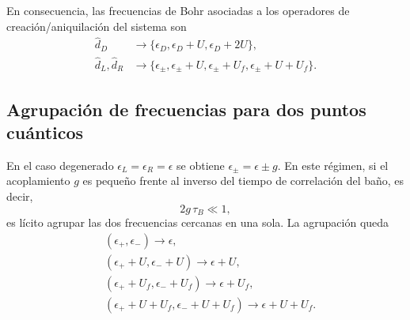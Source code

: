 \begin{appendixs}
En consecuencia, las frecuencias de Bohr asociadas a los operadores de creación/aniquilación del sistema son
\begin{align*}
    \hat{d}_{D} & \rightarrow \{\epsilon_{D}, \epsilon_{D}+U, \epsilon_{D}+2U\}, \\
    \hat{d}_{L}, \hat{d}_{R} & \rightarrow \{\epsilon_{\pm}, \epsilon_{\pm}+U, \epsilon_{\pm}+U_{f}, \epsilon_{\pm}+U+U_{f}\}.
\end{align*}

\subsection{Agrupación de frecuencias para dos puntos cuánticos}
\label{apendix5frecuencygroup}

En el caso degenerado \(\epsilon_{L}=\epsilon_{R}=\epsilon\) se obtiene \(\epsilon_{\pm}=\epsilon\pm g\). En este régimen, si el acoplamiento \(g\) es pequeño frente al inverso del tiempo de correlación del baño, es decir,
\[
2g\,\tau_{B}\ll 1,
\]
es lícito agrupar las dos frecuencias cercanas en una sola. La agrupación queda
\begin{align*}
&(\epsilon_{+},\epsilon_{-}) \to \epsilon,\\
&(\epsilon_{+}+U,\epsilon_{-}+U) \to \epsilon+U,\\
&(\epsilon_{+}+U_{f},\epsilon_{-}+U_{f}) \to \epsilon+U_{f},\\
&(\epsilon_{+}+U+U_{f},\epsilon_{-}+U+U_{f}) \to \epsilon+U+U_{f}.
\end{align*}


\end{appendixs}
